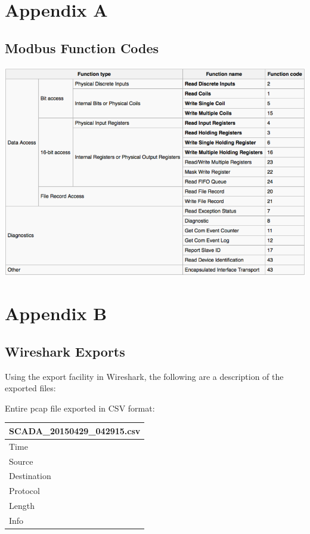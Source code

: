 \documentclass[11pt,]{article}
\begin{document}
\clearpage

\section*{Appendix A}\label{appendix-a}

\subsection{Modbus Function Codes}\label{modbus-function-codes}

\begin{center}\includegraphics{thesis_files/figure-latex/unnamed-chunk-41-1} \end{center}

\clearpage

\section*{Appendix B}\label{appendix-b}

\subsection*{Wireshark Exports}\label{wireshark-exports}

Using the export facility in Wireshark, the following are a description
of the exported files:

Entire pcap file exported in CSV format:

\begin{longtable}[c]{@{}l@{}}
\toprule
SCADA\_20150429\_042915.csv\tabularnewline
\midrule
\endhead
Time\tabularnewline
Source\tabularnewline
Destination\tabularnewline
Protocol\tabularnewline
Length\tabularnewline
Info\tabularnewline
\bottomrule
\end{longtable}
\end{document}
